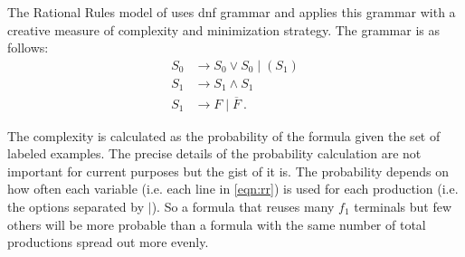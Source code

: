 \documentclass[doc,floatsintext]{apa6}
\begin{document}

The Rational Rules model of \citet{goodmantfg2008} uses \ac{dnf} grammar and applies this grammar with a creative measure of complexity and minimization strategy.
The grammar is as follows:
\begin{align} \label{eqn:rr}
  S_0 &\rightarrow S_0 \vee S_0 \mid (S_1)\\
  S_1 &\rightarrow S_1 \wedge S_1 \nonumber \\
  S_1 &\rightarrow F \mid \overline{F} ~. \nonumber
\end{align}

The complexity is calculated as the probability of the formula given the set of labeled examples.
The precise details of the probability calculation are not important for current purposes but the gist of it is.
The probability depends on how often each variable (i.e. each line in \cref{eqn:rr}) is used for each production (i.e. the options separated by $\mid$).
So a formula that reuses many $f_1$ terminals but few others will be more probable than a formula with the same number of total productions spread out more evenly.
\end{document}
